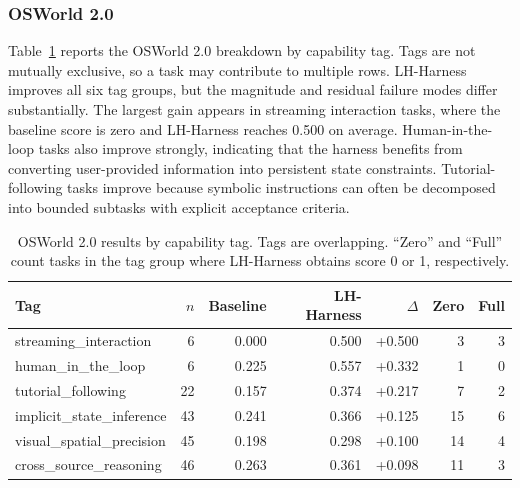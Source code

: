 \subsubsection{OSWorld 2.0}
\label{app:fine-grained-osworld}

Table~\ref{tab:osworld-tag-breakdown} reports the OSWorld 2.0 breakdown by capability tag. Tags are not mutually exclusive, so a task may contribute to multiple rows. LH-Harness improves all six tag groups, but the magnitude and residual failure modes differ substantially. The largest gain appears in streaming interaction tasks, where the baseline score is zero and LH-Harness reaches 0.500 on average. Human-in-the-loop tasks also improve strongly, indicating that the harness benefits from converting user-provided information into persistent state constraints. Tutorial-following tasks improve because symbolic instructions can often be decomposed into bounded subtasks with explicit acceptance criteria.

\begin{table}[t]
\caption{OSWorld 2.0 results by capability tag. Tags are overlapping. ``Zero'' and ``Full'' count tasks in the tag group where LH-Harness obtains score 0 or 1, respectively.}
\label{tab:osworld-tag-breakdown}
\centering
\small
\setlength{\tabcolsep}{4pt}
\begin{tabular}{lrrrrrr}
\toprule
Tag & $n$ & Baseline & LH-Harness & $\Delta$ & Zero & Full \\
\midrule
streaming\_interaction & 6 & 0.000 & 0.500 & +0.500 & 3 & 3 \\
human\_in\_the\_loop & 6 & 0.225 & 0.557 & +0.332 & 1 & 0 \\
tutorial\_following & 22 & 0.157 & 0.374 & +0.217 & 7 & 2 \\
implicit\_state\_inference & 43 & 0.241 & 0.366 & +0.125 & 15 & 6 \\
visual\_spatial\_precision & 45 & 0.198 & 0.298 & +0.100 & 14 & 4 \\
cross\_source\_reasoning & 46 & 0.263 & 0.361 & +0.098 & 11 & 3 \\
\bottomrule
\end{tabular}
\end{table}


